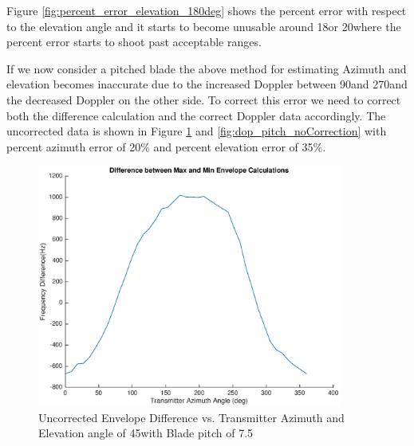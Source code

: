Figure \ref{fig:percent_error_elevation_180deg} shows the percent error with respect to the elevation angle and it starts to become unusable around 18\textdegree \space or 20\textdegree \space where the percent error starts to shoot past acceptable ranges.


If we now consider a pitched blade the above method for estimating Azimuth and elevation becomes inaccurate due to the increased Doppler between 90\textdegree \space and 270\textdegree \space and the decreased Doppler on the other side. To correct this error we need to correct both the difference calculation and the correct Doppler data accordingly. The uncorrected data is shown in Figure \ref{fig:diff_pitch_noCorrection} and \ref{fig:dop_pitch_noCorrection} with percent azimuth error of 20\% and percent elevation error of 35\%.

\begin{figure}
	\begin{center}
		\includegraphics[width=10cm]{images/results/difference_pitch_noCorrection.eps}
		\caption{Uncorrected Envelope Difference vs. Transmitter Azimuth and Elevation angle of 45\textdegree with Blade pitch of 7.5\textdegree}
		\label{fig:diff_pitch_noCorrection}
	\end{center}
\end{figure}

